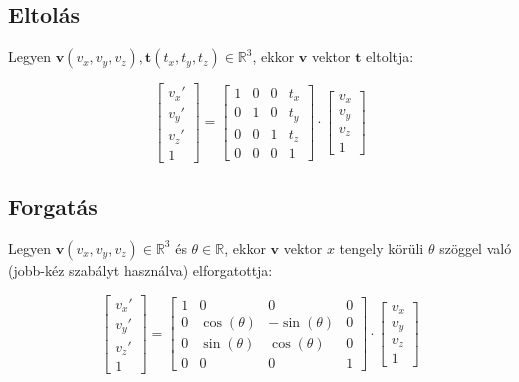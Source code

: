 \subsection{Eltolás}

Legyen $\mathbf{v}(v_x, v_y, v_z), \mathbf{t}(t_x, t_y, t_z)\in\mathbb{R}^3$, ekkor $\mathbf{v}$ vektor $\mathbf{t}$ eltoltja:

\[\left[\begin{array}{c}v_x' \\v_y'\\ v_z'\\ 1 \end{array}\right] = \left[\begin{array}{cccc}1 & 0 & 0 & t_x\\0 & 1 & 0 & t_y\\ 0 & 0 & 1 & t_z\\ 0 & 0 & 0 & 1\end{array}\right] \cdot \left[\begin{array}{c}v_x \\v_y\\ v_z\\ 1 \end{array}\right]\]

\subsection{Forgatás}

Legyen $\mathbf{v}(v_x, v_y, v_z)\in\mathbb{R}^3$ és $\theta\in\mathbb{R}$, ekkor $\mathbf{v}$ vektor $x$ tengely körüli $\theta$ szöggel való (jobb-kéz szabályt használva) elforgatottja:

\[\left[\begin{array}{c}v_x' \\v_y' \\v_z' \\ 1 \end{array}\right] = \left[\begin{array}{cccc}1 & 0 & 0 & 0\\0 & \cos (\theta) & -\sin (\theta) & 0\\ 0 & \sin(\theta) & \cos(\theta) & 0 \\ 0 & 0 & 0 & 1\end{array}\right] \cdot \left[\begin{array}{c}v_x\\ v_y\\ v_z\\ 1\end{array}\right]\]

